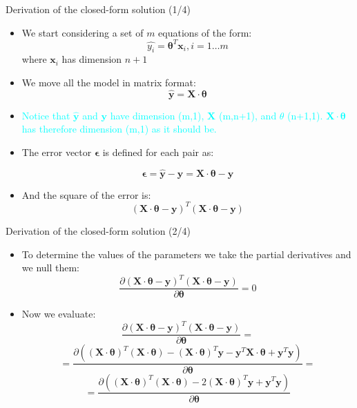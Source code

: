 \documentclass{beamer}
\begin{document}
\begin{frame}
{\centerline{Derivation of the closed-form solution  (1/4) }}

\begin{itemize}
\item We start considering a set of $m$ equations of the form:
$$ \hat{y_i} = \boldsymbol \theta^T \boldsymbol x_i, i=1\ldots m$$
where $\boldsymbol x_i$ has dimension $n+1$
\item We move all the model in matrix format:
$$  \hat{\boldsymbol y} = \boldsymbol X \cdot \boldsymbol \theta   $$
\item   \textcolor{cyan}{Notice that $\hat{\boldsymbol y}$ and $\boldsymbol y$ have dimension (m,1), $\boldsymbol X$ (m,n+1), and $\theta$  (n+1,1). $\boldsymbol X \cdot \boldsymbol \theta$ has therefore dimension (m,1) as it should be.}

\item The error vector $ {\boldsymbol \epsilon}$ is defined for each pair as:

$$ {\boldsymbol \epsilon} = \hat{\boldsymbol y} - \boldsymbol y = \boldsymbol X \cdot \boldsymbol \theta - {\boldsymbol y} $$

\item And the square of the error is:
$$  (\boldsymbol X \cdot \boldsymbol \theta - \boldsymbol y)^T (\boldsymbol X \cdot \boldsymbol \theta - \boldsymbol y) $$

\end{itemize}

\end{frame}

\begin{frame}
{\centerline{Derivation of the closed-form solution  (2/4) }}

\begin{itemize}
\item To determine the values of the parameters we take the partial derivatives and we null them:
$$ \frac{ \partial  (\boldsymbol X \cdot \boldsymbol \theta - \boldsymbol y)^T (\boldsymbol X \cdot \boldsymbol \theta - \boldsymbol y)} { \partial \boldsymbol \theta} = 0 $$
\item Now we evaluate:
$$ \frac{ \partial  (\boldsymbol X \cdot \boldsymbol \theta - \boldsymbol y)^T (\boldsymbol X \cdot \boldsymbol \theta - \boldsymbol y)} { \partial \boldsymbol \theta} = $$
 $$ = \frac{\partial (
 (\boldsymbol X \cdot \boldsymbol \theta)^T (\boldsymbol X \cdot \boldsymbol \theta) -
 (\boldsymbol X \cdot \boldsymbol \theta)^T \boldsymbol y -
 \boldsymbol y^T\boldsymbol X \cdot \boldsymbol \theta +
  \boldsymbol y^T \boldsymbol y
 )}
 { \partial \boldsymbol \theta} = $$
  $$ = \frac{\partial (
 (\boldsymbol X \cdot \boldsymbol \theta)^T (\boldsymbol X \cdot \boldsymbol \theta) -
 2 (\boldsymbol X \cdot \boldsymbol \theta)^T \boldsymbol y +
  \boldsymbol y^T \boldsymbol y
 )}
 { \partial \boldsymbol \theta} $$

\end{itemize}

\end{frame}
\end{document}
